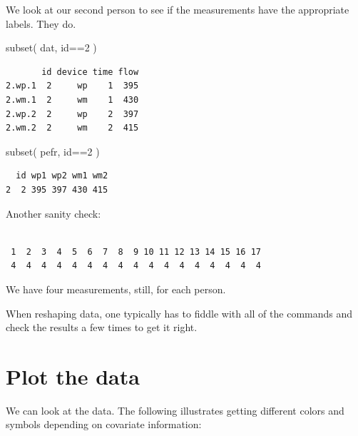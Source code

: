 \documentclass[
  letterpaper,
  DIV=11,
  numbers=noendperiod]{scrreprt}
\newenvironment{Shaded}{}{}
\newcommand{\DecValTok}[1]{\textcolor[rgb]{0.25,0.63,0.44}{#1}}
\newcommand{\FunctionTok}[1]{\textcolor[rgb]{0.02,0.16,0.49}{#1}}
\newcommand{\NormalTok}[1]{#1}
\newcommand{\SpecialCharTok}[1]{\textcolor[rgb]{0.25,0.44,0.63}{#1}}
\begin{document}
We look at our second person to see if the measurements have the
appropriate labels. They do.

\begin{Shaded}
\begin{Highlighting}[]
\FunctionTok{subset}\NormalTok{( dat, id}\SpecialCharTok{==}\DecValTok{2}\NormalTok{ )}
\end{Highlighting}
\end{Shaded}

\begin{verbatim}
       id device time flow
2.wp.1  2     wp    1  395
2.wm.1  2     wm    1  430
2.wp.2  2     wp    2  397
2.wm.2  2     wm    2  415
\end{verbatim}

\begin{Shaded}
\begin{Highlighting}[]
\FunctionTok{subset}\NormalTok{( pefr, id}\SpecialCharTok{==}\DecValTok{2}\NormalTok{ )}
\end{Highlighting}
\end{Shaded}

\begin{verbatim}
  id wp1 wp2 wm1 wm2
2  2 395 397 430 415
\end{verbatim}

Another sanity check:

\begin{Shaded}
\end{Shaded}

\begin{verbatim}

 1  2  3  4  5  6  7  8  9 10 11 12 13 14 15 16 17 
 4  4  4  4  4  4  4  4  4  4  4  4  4  4  4  4  4 
\end{verbatim}

We have four measurements, still, for each person.

When reshaping data, one typically has to fiddle with all of the
commands and check the results a few times to get it right.

\section{Plot the data}\label{plot-the-data}

We can look at the data. The following illustrates getting different
colors and symbols depending on covariate information:
\end{document}
